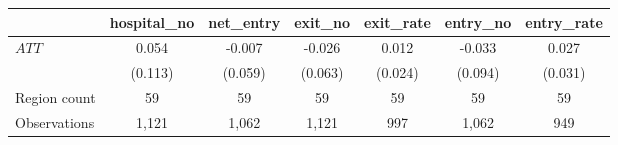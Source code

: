 
\begin{tabular}{lcccccc}
\toprule
 & hospital\_no & net\_entry & exit\_no & exit\_rate & entry\_no & entry\_rate\\
\midrule
$ATT$ & 0.054 & -0.007 & -0.026 & 0.012 & -0.033 & 0.027\\
 & (0.113) & (0.059) & (0.063) & (0.024) & (0.094) & (0.031)\\
\midrule
Region count & 59 & 59 & 59 & 59 & 59 & 59\\
Observations & 1,121 & 1,062 & 1,121 & 997 & 1,062 & 949\\
\bottomrule
\end{tabular}
